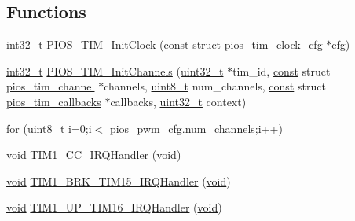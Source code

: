 \subsection*{Functions}
\begin{DoxyCompactItemize}
\item 
\hyperlink{group___n_a_m_e_gafd12020da5a235dfcf0c3c748fb5baed}{int32\-\_\-t} \hyperlink{group___p_i_o_s___t_i_m_ga091c161ba7b19b91067616f0cbd768fc}{P\-I\-O\-S\-\_\-\-T\-I\-M\-\_\-\-Init\-Clock} (\hyperlink{group___n_a_m_e_ga7ae6d0e43244213b34de2c2b9aa30da6}{const} struct \hyperlink{structpios__tim__clock__cfg}{pios\-\_\-tim\-\_\-clock\-\_\-cfg} $\ast$cfg)
\item 
\hyperlink{group___n_a_m_e_gafd12020da5a235dfcf0c3c748fb5baed}{int32\-\_\-t} \hyperlink{group___p_i_o_s___t_i_m_ga7f5717527aad92ccdff6c7a1841754f7}{P\-I\-O\-S\-\_\-\-T\-I\-M\-\_\-\-Init\-Channels} (\hyperlink{stdint_8h_a435d1572bf3f880d55459d9805097f62}{uint32\-\_\-t} $\ast$tim\-\_\-id, \hyperlink{group___n_a_m_e_ga7ae6d0e43244213b34de2c2b9aa30da6}{const} struct \hyperlink{structpios__tim__channel}{pios\-\_\-tim\-\_\-channel} $\ast$channels, \hyperlink{stdint_8h_aba7bc1797add20fe3efdf37ced1182c5}{uint8\-\_\-t} num\-\_\-channels, \hyperlink{group___n_a_m_e_ga7ae6d0e43244213b34de2c2b9aa30da6}{const} struct \hyperlink{structpios__tim__callbacks}{pios\-\_\-tim\-\_\-callbacks} $\ast$callbacks, \hyperlink{stdint_8h_a435d1572bf3f880d55459d9805097f62}{uint32\-\_\-t} context)
\item 
\hyperlink{group___p_i_o_s___t_i_m_ga354d20ebcb9396fb9b160590fcef9cee}{for} (\hyperlink{stdint_8h_aba7bc1797add20fe3efdf37ced1182c5}{uint8\-\_\-t} i=0;i$<$ \hyperlink{structpios__pwm__cfg_acf9d41bfa9ce5ee489fcb27a98605e5c}{pios\-\_\-pwm\-\_\-cfg.\-num\-\_\-channels};i++)
\item 
\hyperlink{group___n_a_m_e_ga18028b8badbf1ea7e704ccac3c488e82}{void} \hyperlink{group___p_i_o_s___t_i_m_gae8a61b27afdb07c70d6b863c44284ca6}{T\-I\-M1\-\_\-\-C\-C\-\_\-\-I\-R\-Q\-Handler} (\hyperlink{group___n_a_m_e_ga18028b8badbf1ea7e704ccac3c488e82}{void})
\item 
\hyperlink{group___n_a_m_e_ga18028b8badbf1ea7e704ccac3c488e82}{void} \hyperlink{group___p_i_o_s___t_i_m_ga37c3c8d5fe4f0106410dea2c1147b8a9}{T\-I\-M1\-\_\-\-B\-R\-K\-\_\-\-T\-I\-M15\-\_\-\-I\-R\-Q\-Handler} (\hyperlink{group___n_a_m_e_ga18028b8badbf1ea7e704ccac3c488e82}{void})
\item 
\hyperlink{group___n_a_m_e_ga18028b8badbf1ea7e704ccac3c488e82}{void} \hyperlink{group___p_i_o_s___t_i_m_gab19e96bc9fe4483b9fdf25047c61238e}{T\-I\-M1\-\_\-\-U\-P\-\_\-\-T\-I\-M16\-\_\-\-I\-R\-Q\-Handler} (\hyperlink{group___n_a_m_e_ga18028b8badbf1ea7e704ccac3c488e82}{void})

\end{DoxyCompactItemize}
